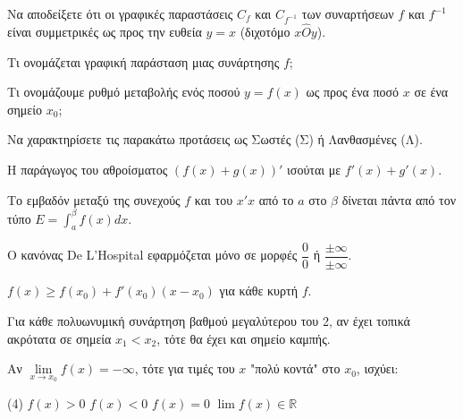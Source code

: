 \documentclass[11pt,a4paper]{article}
\newcommand{\kerkissans}[1]{{\fontfamily{maksf}\selectfont \textbf{#1}}}
\renewcommand{\textdexiakeraia}{}
\newcommand{\dint}{\displaystyle\int}
\newcommand\themanum{A}
\newcounter{thema}[section]
\renewcommand{\thethema}{\arabic{thema}}
\newcommand{\Thema}{\refstepcounter{thema}{\textbf{\textcolor{black}{\faPenSquare\ \  \large \kerkissans{\textbf{\thethemaο\hspace{2mm}Διαγώνισμα - Θέμα \themanum}}}}}\hspace{0mm}}{}
\newenvironment{thema}[1]
{\begin{tcolorbox}[title=\Thema\kerkissans{\textbf{\large{  #1}}},breakable,
enhanced standard,titlerule=0pt,toprule=0pt, rightrule=0pt, bottomrule=0pt,
colback=white,left=0mm,top=1mm,bottom=0mm,
boxrule=0pt,
colframe=white,leftrule=0mm,sharp corners,coltitle=black]
\renewcommand{\themanum}{#1}}
{\end{tcolorbox}}
\newcommand{\eng}[1]{\selectlanguage{english}#1\selectlanguage{greek}}
\begin{document}
\begin{thema}{A}
\begin{erwthma}
    \item Να αποδείξετε ότι οι γραφικές παραστάσεις $ C_f $ και $ C_{f^{-1}} $ των συναρτήσεων $ f $ και $ f^{-1} $ είναι συμμετρικές ως προς την ευθεία $ y=x $ (διχοτόμο $x\hat{O}y$).
    \item Τι ονομάζεται γραφική παράσταση μιας συνάρτησης $f$;
    \item Τι ονομάζουμε ρυθμό μεταβολής ενός ποσού $y=f(x)$ ως προς ένα ποσό $x$ σε ένα σημείο $x_0$;
    \item Να χαρακτηρίσετε τις παρακάτω προτάσεις ως Σωστές (Σ) ή Λανθασμένες (Λ).
    \begin{alist}
        \item Η παράγωγος του αθροίσματος $(f(x)+g(x))'$ ισούται με $f'(x)+g'(x)$.
        \item Το εμβαδόν μεταξύ της συνεχούς $f$ και του $x'x$ από το $a$ στο $\beta$ δίνεται πάντα από τον τύπο $E = \dint_a^\beta f(x) dx$.
        \item Ο κανόνας \eng{De L'Hospital} εφαρμόζεται μόνο σε μορφές $\dfrac{0}{0}$ ή $\dfrac{\pm \infty}{\pm \infty}$.
        \item $f(x) \ge f(x_0) + f'(x_0)(x-x_0)$ για κάθε κυρτή $f$.
        \item Για κάθε πολυωνυμική συνάρτηση βαθμού μεγαλύτερου του 2, αν έχει τοπικά ακρότατα σε σημεία $x_1<x_2$, τότε θα έχει και σημείο καμπής.
    \end{alist}
    \item Αν $\lim\limits_{x\to x_0} f(x) = -\infty$, τότε για τιμές του $x$ "πολύ κοντά" στο $x_0$, ισχύει:
    \begin{tasks}[label=\let\textdexiakeraia\relax\alph*.](4)
        \task $f(x) > 0$
        \task $f(x) < 0$
        \task $f(x) = 0$
        \task $\lim\limits f(x) \in \mathbb{R}$
    \end{tasks}
\end{erwthma}
\end{thema}
\vspace{1cm}
\end{document}
